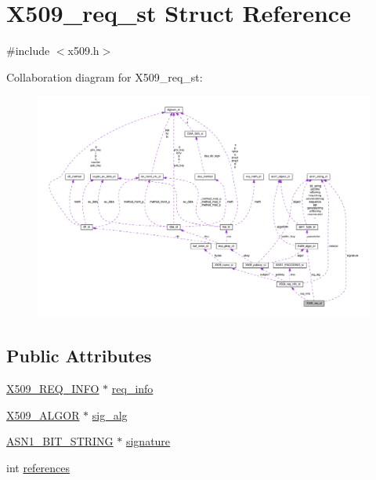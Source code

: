 \hypertarget{struct_x509__req__st}{}\section{X509\+\_\+req\+\_\+st Struct Reference}
\label{struct_x509__req__st}


{\ttfamily \#include $<$x509.\+h$>$}



Collaboration diagram for X509\+\_\+req\+\_\+st\+:
\nopagebreak
\begin{figure}[H]
\begin{center}
\leavevmode
\includegraphics[width=350pt]{struct_x509__req__st__coll__graph}
\end{center}
\end{figure}
\subsection*{Public Attributes}
\begin{DoxyCompactItemize}
\item 
\hyperlink{x509_8h_a69f978223ac282eaa2b2740ef6684d96}{X509\+\_\+\+R\+E\+Q\+\_\+\+I\+N\+FO} $\ast$ \hyperlink{struct_x509__req__st_acabf08f567bc1a05244378f6b9ce4ce0}{req\+\_\+info}
\item 
\hyperlink{ossl__typ_8h_aa2b6185e6254f36f709cd6577fb5022e}{X509\+\_\+\+A\+L\+G\+OR} $\ast$ \hyperlink{struct_x509__req__st_aece99c32f3a4dfaae643110bf2f8a8f6}{sig\+\_\+alg}
\item 
\hyperlink{ossl__typ_8h_af837aaa00e151b1e8773aea5a8fe1cc4}{A\+S\+N1\+\_\+\+B\+I\+T\+\_\+\+S\+T\+R\+I\+NG} $\ast$ \hyperlink{struct_x509__req__st_a43ddd2fab56363b07b095e6f1a6d43d1}{signature}
\item 
int \hyperlink{struct_x509__req__st_a4c2c07b36957fd3bb1ec804265a0184d}{references}
\end{DoxyCompactItemize}


